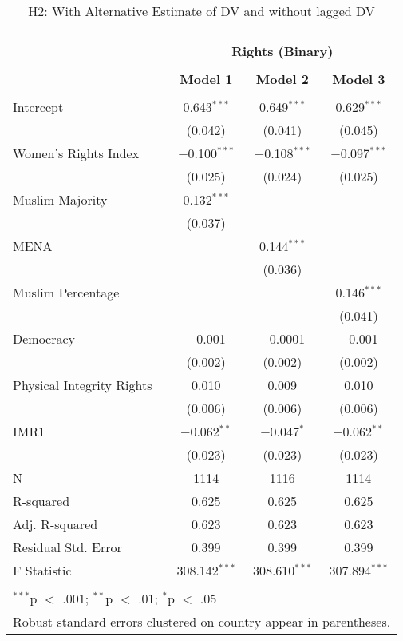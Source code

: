 
\begin{table}[!htbp] \centering 
  \caption{H2: With Alternative Estimate of DV and without lagged DV} 
  \label{} 
\begin{tabular}{@{\extracolsep{5pt}}lccc} 
\\[-1.8ex]\hline \\[-1.8ex] 
\\[-1.8ex] & \multicolumn{3}{c}{\textbf{Rights (Binary)}} \\ 
\\[-1.8ex] & \textbf{Model 1} & \textbf{Model 2} & \textbf{Model 3}\\ 
\hline \\[-1.8ex] 
 Intercept & 0.643$^{***}$ & 0.649$^{***}$ & 0.629$^{***}$ \\ 
  & (0.042) & (0.041) & (0.045) \\ 
  Women's Rights Index & $-$0.100$^{***}$ & $-$0.108$^{***}$ & $-$0.097$^{***}$ \\ 
  & (0.025) & (0.024) & (0.025) \\ 
  Muslim Majority & 0.132$^{***}$ &  &  \\ 
  & (0.037) &  &  \\ 
  MENA &  & 0.144$^{***}$ &  \\ 
  &  & (0.036) &  \\ 
  Muslim Percentage &  &  & 0.146$^{***}$ \\ 
  &  &  & (0.041) \\ 
  Democracy & $-$0.001 & $-$0.0001 & $-$0.001 \\ 
  & (0.002) & (0.002) & (0.002) \\ 
  Physical Integrity Rights & 0.010 & 0.009 & 0.010 \\ 
  & (0.006) & (0.006) & (0.006) \\ 
  IMR1 & $-$0.062$^{**}$ & $-$0.047$^{*}$ & $-$0.062$^{**}$ \\ 
  & (0.023) & (0.023) & (0.023) \\ 
 N & 1114 & 1116 & 1114 \\ 
R-squared & 0.625 & 0.625 & 0.625 \\ 
Adj. R-squared & 0.623 & 0.623 & 0.623 \\ 
Residual Std. Error & 0.399 & 0.399 & 0.399 \\ 
F Statistic & 308.142$^{***}$ & 308.610$^{***}$ & 307.894$^{***}$ \\ 
\hline \\[-1.8ex] 
\multicolumn{4}{l}{$^{***}$p $<$ .001; $^{**}$p $<$ .01; $^{*}$p $<$ .05} \\ 
\multicolumn{4}{l}{Robust standard errors clustered on country appear in parentheses.} \\ 
\end{tabular} 
\end{table} 
